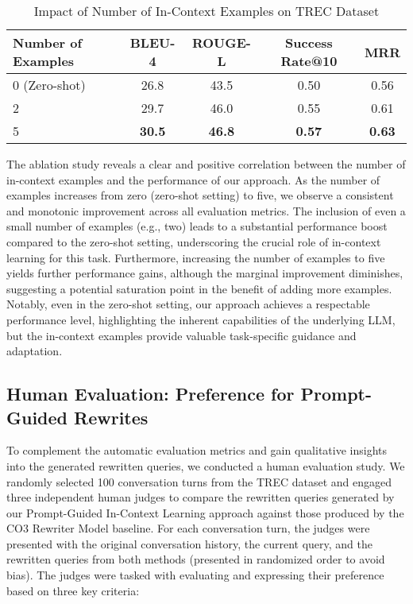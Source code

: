 \begin{table*}[!t]
    \centering
    \caption{Impact of Number of In-Context Examples on TREC Dataset}
    \label{tab:ablation_examples}
    \begin{tabular}{lcccc}
        \toprule
        Number of Examples & BLEU-4 & ROUGE-L & Success Rate@10 & MRR \\
        \midrule
        0 (Zero-shot) & 26.8 & 43.5 & 0.50 & 0.56 \\
        2 & 29.7 & 46.0 & 0.55 & 0.61 \\
        5 & \textbf{30.5} & \textbf{46.8} & \textbf{0.57} & \textbf{0.63} \\
        \bottomrule
    \end{tabular}
\end{table*}

The ablation study reveals a clear and positive correlation between the number of in-context examples and the performance of our approach.  As the number of examples increases from zero (zero-shot setting) to five, we observe a consistent and monotonic improvement across all evaluation metrics.  The inclusion of even a small number of examples (e.g., two) leads to a substantial performance boost compared to the zero-shot setting, underscoring the crucial role of in-context learning for this task.  Furthermore, increasing the number of examples to five yields further performance gains, although the marginal improvement diminishes, suggesting a potential saturation point in the benefit of adding more examples.  Notably, even in the zero-shot setting, our approach achieves a respectable performance level, highlighting the inherent capabilities of the underlying LLM, but the in-context examples provide valuable task-specific guidance and adaptation.

\subsection{Human Evaluation: Preference for Prompt-Guided Rewrites}

To complement the automatic evaluation metrics and gain qualitative insights into the generated rewritten queries, we conducted a human evaluation study. We randomly selected 100 conversation turns from the TREC dataset and engaged three independent human judges to compare the rewritten queries generated by our Prompt-Guided In-Context Learning approach against those produced by the CO3 Rewriter Model baseline.  For each conversation turn, the judges were presented with the original conversation history, the current query, and the rewritten queries from both methods (presented in randomized order to avoid bias).  The judges were tasked with evaluating and expressing their preference based on three key criteria:

